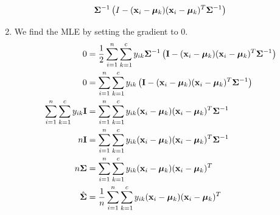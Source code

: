 \documentclass[submit]{harvardml}
\begin{document}
\begin{solution}
\begin{sol}
\begin{enumerate}
\begin{align*}
\mathbf{\Sigma}^{-1} \left(I - (\mathbf{x}_i-\boldsymbol{\mu}_k) (\mathbf{x}_i-\boldsymbol{\mu}_k)^T \mathbf{\Sigma}^{-1}\right)
\end{align*}
%
\item
We find the MLE by setting the gradient to 0.
\begin{align*}
0 &= \frac12 \sum_{i=1}^n \sum_{k=1}^c y_{ik}
\mathbf{\Sigma}^{-1} \left(\mathbf{I} - (\mathbf{x}_i-\boldsymbol{\mu}_k) (\mathbf{x}_i-\boldsymbol{\mu}_k)^T \mathbf{\Sigma}^{-1}\right)\\
0 &= \sum_{i=1}^n \sum_{k=1}^c y_{ik} \left(\mathbf{I} - (\mathbf{x}_i-\boldsymbol{\mu}_k) (\mathbf{x}_i-\boldsymbol{\mu}_k)^T \mathbf{\Sigma}^{-1}\right)\\
\sum_{i=1}^n \sum_{k=1}^c y_{ik} \mathbf{I} &= \sum_{i=1}^n \sum_{k=1}^c y_{ik} (\mathbf{x}_i-\boldsymbol{\mu}_k) (\mathbf{x}_i-\boldsymbol{\mu}_k)^T \mathbf{\Sigma}^{-1}\\
n \mathbf{I} &= \sum_{i=1}^n \sum_{k=1}^c y_{ik} (\mathbf{x}_i-\boldsymbol{\mu}_k) (\mathbf{x}_i-\boldsymbol{\mu}_k)^T \mathbf{\Sigma}^{-1}\\
n \mathbf{\Sigma} &= \sum_{i=1}^n \sum_{k=1}^c y_{ik} (\mathbf{x}_i-\boldsymbol{\mu}_k) (\mathbf{x}_i-\boldsymbol{\mu}_k)^T\\
\hat{\mathbf{\Sigma}} &= \frac{1}{n} \sum_{i=1}^n \sum_{k=1}^c y_{ik} (\mathbf{x}_i-\boldsymbol{\mu}_k) (\mathbf{x}_i-\boldsymbol{\mu}_k)^T
\end{align*}

\end{enumerate}
\end{sol}
\end{solution}

\newpage
\end{document}
